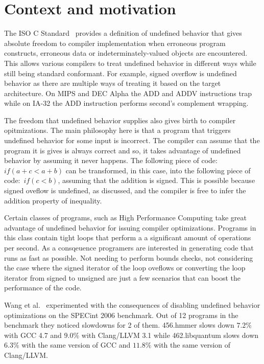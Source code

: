 \section{Context and motivation}

The ISO C Standard~\cite{iso90} provides a definition of undefined
behavior that gives absolute freedom to compiler implementation when
erroneous program constructs, erroneous data or indeterminately-valued
objects are encountered. This allows various compilers to treat
undefined behavior in different ways while still being standard
conformant. For example, signed overflow is undefined behavior as there
are multiple ways of treating it based on the target architecture. On
MIPS and DEC Alpha the ADD and ADDV instructions trap while on IA-32 the
ADD instruction performs second's complement wrapping.

The freedom that undefined behavior supplies also gives birth to
compiler opitmizations. The main philosophy here is that a program that
triggers undefined behavior for some input is incorrect. The compiler
can assume that the program it is gives is always correct and so, it
takes advantage of undefined behavior by assuming it never happens. The
following piece of code:~\textit{\(if (a + c < a + b)\)} can be
transformed, in this case, into the following piece of
code:~\textit{\(if (c < b)\)}, assuming that the addition is signed.
This is possible because signed oveflow is undefined, as discussed, and
the compiler is free to infer the addition property of inequality.

Certain classes of programs, such as High Performance Computing take
great advantage of undefined behavior for issuing compiler
optimizations. Programs in this class contain tight loops that perform a
a significant amount of operations per second. As a consqeuence
programers are interested in generating code that runs as fast as
possible. Not needing to perform bounds checks, not considering the case
where the signed iterator of the loop oveflows or converting the loop
iterator from signed to unsigned are just a few scenarios that can boost
the performance of the code.

Wang et al.~\cite{wang2012undefined} experimented with the consequences
of disabling undefined behavior optimizations on the SPECint 2006
benchmark. Out of 12 programs in the benchmark they noticed slowdowns
for 2 of them. 456.hmmer slows down $7.2\%$ with GCC 4.7 and $9.0\%$
with Clang/LLVM 3.1 while 462.libquantum slows down $6.3\%$ with the
same version of GCC and $11.8\%$ with the same version of Clang/LLVM.

